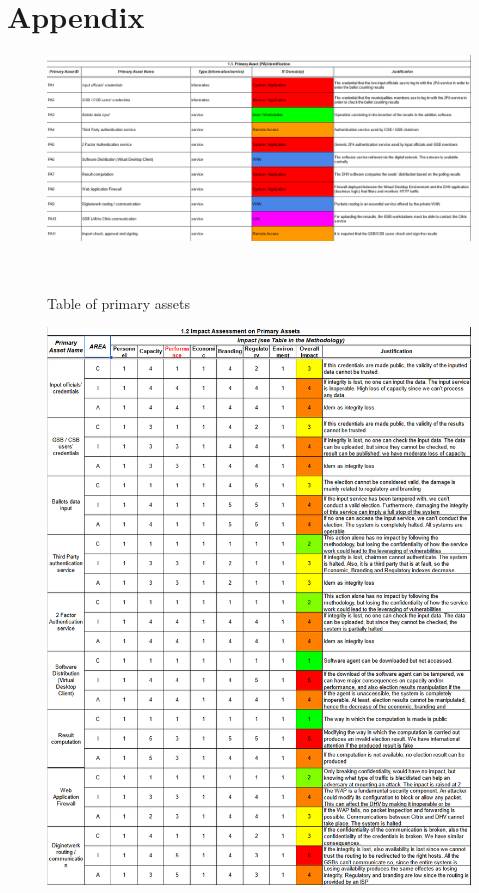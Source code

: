 \chapter*{Appendix}

\begin{figure}[ht!]
    \centering
    \includegraphics[keepaspectratio,width=1\textwidth]{03-risk-analysis/001-IA/img/PRASS.png}
    \caption{Table of primary assets}~\label{fig:paTable}
\end{figure}

\begin{figure}[h!]
    \centering
    \includegraphics[keepaspectratio,width=1\textwidth]{03-risk-analysis/002-SAIV/img/cut1Impa.png}~\label{fig:impact1}
\end{figure}

